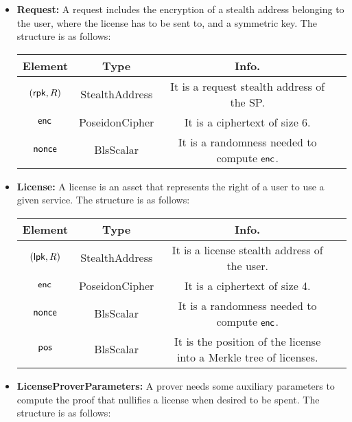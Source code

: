 \begin{itemize}
    \item \textbf{Request:} A request includes the encryption of a stealth address belonging to the user, where the license has to be sent to, and a symmetric key. The structure is as follows:

    \begin{center}
        \begin{tabular}{ |c|c|c|c| } 
        \hline
        \textbf{Element} & \textbf{Type} & \textbf{Info.} \\
        \hline
        $(\mathsf{rpk}, R)$ & StealthAddress & It is a request stealth address of the SP. \\
        $\mathsf{enc}$ & PoseidonCipher & It is a ciphertext of size 6. \\
        $\mathsf{nonce}$ & BlsScalar & It is a randomness needed to compute $\mathsf{enc}$. \\ 
        \hline
        \end{tabular}
    \end{center}


    \item \textbf{License:} A license is an asset that represents the right of a user to use a given service. The structure is as follows:

    \begin{center}
        \begin{tabular}{ |c|c|c|c| } 
        \hline
        \textbf{Element} & \textbf{Type} & \textbf{Info.} \\
        \hline
        $(\mathsf{lpk}, R)$ & StealthAddress & It is a license stealth address of the user. \\
        $\mathsf{enc}$ & PoseidonCipher & It is a ciphertext of size 4. \\
        $\mathsf{nonce}$ & BlsScalar & It is a randomness needed to compute $\mathsf{enc}$. \\ 
        $\mathsf{pos}$ & BlsScalar & It is the position of the license into a Merkle tree of licenses. \\ 
        \hline
        \end{tabular}
    \end{center}

    \item \textbf{LicenseProverParameters:} A prover needs some auxiliary parameters to compute the proof that nullifies a license when desired to be spent. The structure is as follows:


\end{itemize}
